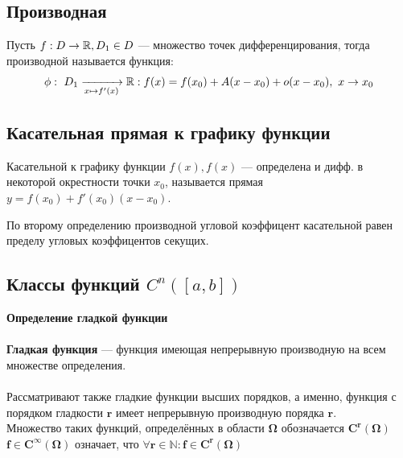 \newpage
\subsection{Производная}
\begin{definition}
Пусть $f: D \rightarrow \operatorname*{\mathbb{R}}, D_1 \in D$ {---} множество точек дифференцирования, тогда производной называется функция:
$$ \phi:\ D_1 \xrightarrow[x \mapsto f'(x)]{} \operatorname*{\mathbb{R}}: f(x) = f(x_0) + A(x - x_0) + o(x - x_0),\ x \rightarrow x_0$$
\end{definition}
 
\newpage
\subsection{Касательная прямая к графику функции}
\begin{definition}
Касательной к графику функции $f(x), f(x)$ {---} определена и дифф. в некоторой окрестности точки $x_0$, называется прямая $y = f(x_0) + f'(x_0)(x - x_0)$.
\end{definition}
\begin{remark}
По второму определению производной угловой коэффицент касательной равен пределу угловых коэффицентов секущих.    
\end{remark}

\newpage
{}
\subsection{Классы функций $C^n([a,b])$}
\textbf{Определение гладкой функции} \\\\
\textbf{Гладкая функция} — функция имеющая непрерывную производную на всем множестве определения. \\\\
Рассматривают также гладкие функции высших порядков, а именно, функция с порядком гладкости $\mathbf{r}$ имеет непрерывную производную порядка $\mathbf{r}$. \\
Множество таких функций, определённых в области $\mathbf{\Omega}$ обозначается $\mathbf{C^{r}(\Omega)}$ \\
$\mathbf{f \in C^{\infty}(\Omega)}$ означает, что $\mathbf{\forall r \in \mathbb{N} : f \in C^{r}(\Omega)}$ \\\\
\newpage

